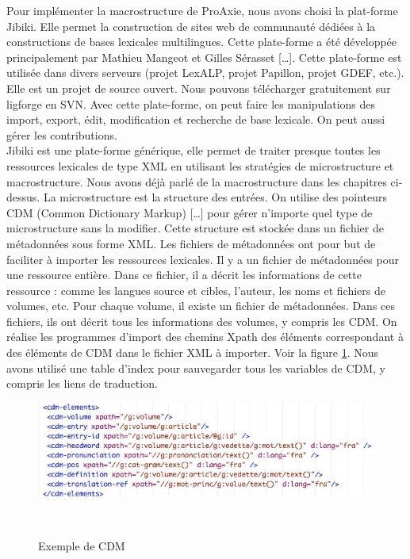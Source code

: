 \documentclass[10pt,a4paper,twoside]{article}
\begin{document}
\cite{MMCE11}
Pour implémenter la macrostructure de ProAxie, nous avons choisi la plat-forme Jibiki. Elle permet la construction de sites web de communauté dédiées à la constructions de bases lexicales multilingues. Cette plate-forme a été développée principalement par Mathieu Mangeot et Gilles Sérasset […]. Cette plate-forme est utilisée dans divers serveurs (projet LexALP, projet Papillon, projet GDEF, etc.). Elle est un projet de source ouvert. Nous pouvons télécharger gratuitement sur ligforge en SVN. Avec cette plate-forme, on peut faire les manipulations des import, export, édit, modification et recherche de base lexicale. On peut aussi gérer les contributions. \\
Jibiki est une plate-forme générique, elle permet de traiter presque toutes les ressources lexicales de type XML en utilisant les stratégies de microstructure et macrostructure. Nous avons déjà parlé de la macrostructure dans les chapitres ci-dessus. La microstructure est la structure des entrées. On utilise des pointeurs CDM (Common Dictionary Markup) […] pour gérer n’importe quel type de microstructure sans la modifier. Cette structure est stockée dans un fichier de métadonnées sous forme XML. Les fichiers de métadonnées ont pour but de faciliter à importer les ressources lexicales.  Il y a un fichier de métadonnées pour une ressource entière.  Dans ce fichier, il a décrit les informations de cette ressource : comme les langues source et cibles, l’auteur, les noms et fichiers de volumes, etc. Pour chaque volume, il existe un fichier de métadonnées. Dans ces fichiers, ils ont décrit tous les informations des volumes, y compris les CDM. On réalise les programmes d’import des chemins Xpath des éléments correspondant à des éléments de CDM dans le fichier XML à importer. Voir la figure \ref{image-CDM}. Nous avons utilisé une table d’index pour sauvegarder tous les variables de CDM, y compris les liens de traduction. \\
\begin{figure}[htbp] 
\begin{center} 
\includegraphics[width=14cm]{images/CDM.jpg}
\end{center} 
\caption{Exemple de CDM} \label{image-CDM} \
\end{figure}
\end{document}
